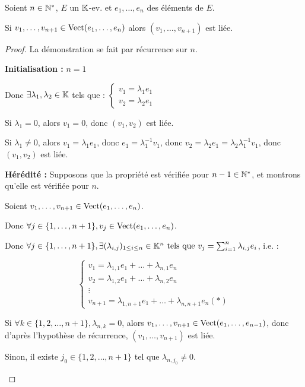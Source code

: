 \documentclass[12pt, a4paper]{report}
\begin{document}
\begin{theorem}
    Soient $n \in \mathbb{N}^*$, $E$ un $\mathbb{K}$-ev. et $e_1,\dots,e_n$ des éléments de $E$.

    Si $v_1,\dots,v_{n+1} \in \mathrm{Vect}(e_1,\dots,e_n)$ alors $(v_1,\dots,v_{n+1})$ est liée.
\end{theorem}

\begin{proof}
    La démonstration se fait par récurrence sur $n$.

    \textbf{Initialisation :} $n=1$

    Donc $\exists \lambda_1,\lambda_2 \in \mathbb{K}$ tels que : $\displaystyle\begin{cases}
    v_1 = \lambda_1 e_1\\
    v_2 = \lambda_2 e_1
    \end{cases}$

    Si $\lambda_1 = 0$, alors $v_1 = 0$, donc $(v_1,v_2)$ est liée.

    Si $\lambda_1 \ne 0$, alors $v_1 = \lambda_1 e_1$, donc $e_1 = \lambda_1^{-1} v_1$, donc $v_2 = \lambda_2 e_1 = \lambda_2 \lambda_1^{-1} v_1$, donc $(v_1,v_2)$ est liée.

    \textbf{Hérédité :} Supposons que la propriété est vérifiée pour $n-1 \in \mathbb{N}^*$, et montrons qu'elle est vérifiée pour $n$.

    \begin{outline}
        \1 Soient $v_1,\dots,v_{n+1} \in \mathrm{Vect}(e_1,\dots,e_n)$.
    
        \1 Donc $\forall j \in \{1,\dots,n+1\}, v_j \in \mathrm{Vect}(e_1,\dots,e_n)$.

        \1 Donc $\forall j \in \{1,\dots,n+1\}, \exists (\lambda_{i,j})_{1 \le i \le n} \in \mathbb{K}^n \text{ tels que } v_j = \sum_{i=1}^n \lambda_{i,j} e_i$, i.e. :

        $$\begin{cases}
v_1 = \lambda_{1,1} e_1 + \dots + \lambda_{n,1} e_n\\
v_2 = \lambda_{1,2} e_1 + \dots + \lambda_{n,2} e_n\\
\vdots\\
v_{n+1} = \lambda_{1,n+1} e_1 + \dots + \lambda_{n,n+1} e_n (*)
        \end{cases}$$

        \1 Si $\forall k \in \{1,2,\dots,n+1\}, \lambda_{n,k} = 0$, alors $v_1,\dots,v_{n+1} \in \mathrm{Vect}(e_1,\dots,e_{n-1})$, donc d'après l'hypothèse de récurrence, $(v_1,\dots,v_{n+1})$ est liée.

        \1 Sinon, il existe $j_0 \in \{1,2,\dots,n+1\}$ tel que $\lambda_{n,j_0} \ne 0$.


\end{outline}
\end{proof}
\end{document}
